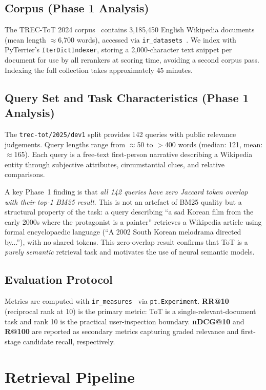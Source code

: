 \documentclass[conference]{IEEEtran}
\begin{document}
\subsection{Corpus (Phase 1 Analysis)}
The TREC-ToT 2024 corpus~\cite{trec-tot} contains 3{,}185{,}450 English Wikipedia
documents (mean length $\approx$6{,}700 words), accessed via
\texttt{ir\_datasets}~\cite{irdatasets}.
We index with PyTerrier's \texttt{IterDictIndexer}, storing a 2{,}000-character
text snippet per document for use by all rerankers at scoring time, avoiding
a second corpus pass.
Indexing the full collection takes approximately 45 minutes.

\subsection{Query Set and Task Characteristics (Phase 1 Analysis)}
The \texttt{trec-tot/2025/dev1} split provides 142 queries with public relevance
judgements.
Query lengths range from $\approx$50 to $>$400 words (median: 121, mean: $\approx$165).
Each query is a free-text first-person narrative describing a Wikipedia entity
through subjective attributes, circumstantial clues, and relative comparisons.

A key Phase~1 finding is that \textit{all 142 queries have zero Jaccard token overlap
with their top-1 BM25 result}.
This is not an artefact of BM25 quality but a structural property of the task:
a query describing ``a sad Korean film from the early 2000s where the protagonist
is a painter'' retrieves a Wikipedia article using formal encyclopaedic language
(``A 2002 South Korean melodrama directed by...''), with no shared tokens.
This zero-overlap result confirms that ToT is a \textit{purely semantic} retrieval
task and motivates the use of neural semantic models.

\subsection{Evaluation Protocol}
Metrics are computed with \texttt{ir\_measures}~\cite{irm} via \texttt{pt.Experiment}.
\textbf{RR@10} (reciprocal rank at 10) is the primary metric: ToT is a
single-relevant-document task and rank 10 is the practical user-inspection boundary.
\textbf{nDCG@10} and \textbf{R@100} are reported as secondary metrics capturing
graded relevance and first-stage candidate recall, respectively.

\section{Retrieval Pipeline}
\label{sec:modeling}
\end{document}
